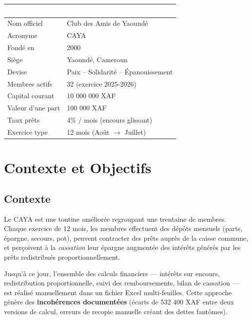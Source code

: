 \documentclass[12pt, a4paper]{report}
\begin{document}
\medskip
\begin{center}
\begin{tabular}{L{5cm}L{8cm}}
  \toprule
  \textcolor{white}{\textbf{Paramètre}} & \textcolor{white}{\textbf{Valeur}} \\
  \midrule
  Nom officiel      & Club des Amis de Yaoundé \\
  Acronyme          & CAYA \\
  Fondé en          & 2000 \\
  Siège             & Yaoundé, Cameroun \\
  Devise            & Paix – Solidarité – Épanouissement \\
  Membres actifs    & 32 (exercice 2025-2026) \\
  Capital courant   & 10 000 000 XAF \\
  Valeur d'une part & 100 000 XAF \\
  Taux prêts        & 4\% / mois (encours glissant) \\
  Exercice type     & 12 mois (Août $\rightarrow$ Juillet) \\
  \bottomrule
\end{tabular}
\end{center}

\chapter{Contexte et Objectifs}

\section{Contexte}

Le CAYA est une tontine améliorée regroupant une trentaine de membres. Chaque exercice de 12 mois,
les membres effectuent des dépôts mensuels (parts, épargne, secours, pot), peuvent contracter des
prêts auprès de la caisse commune, et perçoivent à la \textit{cassation} leur épargne augmentée
des intérêts générés par les prêts redistribués proportionnellement.

\medskip
Jusqu'à ce jour, l'ensemble des calculs financiers — intérêts sur encours, redistribution proportionnelle,
suivi des remboursements, bilan de cassation — est réalisé manuellement dans un fichier Excel
multi-feuilles. Cette approche génère des \textbf{incohérences documentées} (écarts de 532 400 XAF
entre deux versions de calcul, erreurs de recopie manuelle créant des dettes fantômes).
\end{document}
